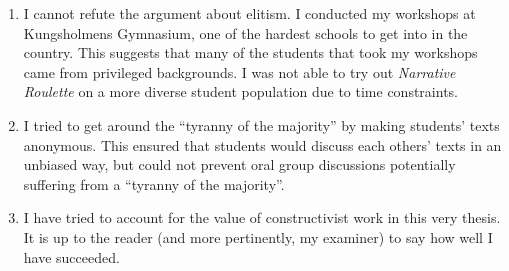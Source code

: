 \begin{enumerate}

\item I cannot refute the argument about elitism. I conducted my workshops at Kungsholmens Gymnasium, one of the hardest schools to get into in the country. This suggests that many of the students that took my workshops came from privileged backgrounds. I was not able to try out \textit{Narrative Roulette} on a more diverse student population due to time constraints.

\item I tried to get around the ``tyranny of the majority'' by making students' texts anonymous. This ensured that students would discuss each others' texts in an unbiased way, but could not prevent oral group discussions potentially suffering from a ``tyranny of the majority''.

\item I have tried to account for the value of constructivist work in this very thesis. It is up to the reader (and more pertinently, my examiner) to say how well I have succeeded.

\end{enumerate} 
